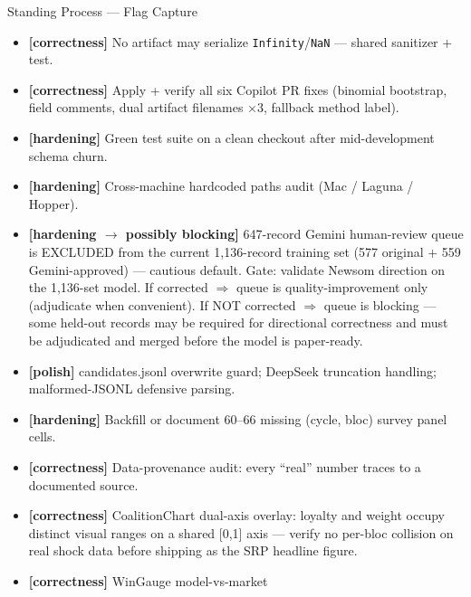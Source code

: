 \documentclass[11pt]{article}
\begin{document}
\begin{taskbox}{Standing Process --- Flag Capture}
{\begin{itemize}[leftmargin=1.6em, itemsep=1pt]
      Production covariance is the identity/diagonal fallback, NOT
      Ledoit-Wolf. Confirmed live: win-prob CI [0.653, 0.668] is MC
      sampling error around diagonal cov. OK for MVP; blocks paper-grade
      results. Fix: load real panel data so
      \texttt{run\_ilr\_montecarlo} uses the 20-cycle Ledoit-Wolf
      $\Sigma_\Delta$ rather than the near-zero fallback.
    \item[$\square$] \textbf{[correctness]} No artifact may serialize
      \texttt{Infinity}/\texttt{NaN} --- shared sanitizer + test.
    \item[$\square$] \textbf{[correctness]} Apply + verify all six Copilot
      PR fixes (binomial bootstrap, field comments, dual artifact
      filenames $\times$3, fallback method label).
    \item[$\square$] \textbf{[hardening]} Green test suite on a clean
      checkout after mid-development schema churn.
    \item[$\square$] \textbf{[hardening]} Cross-machine hardcoded paths
      audit (Mac / Laguna / Hopper).
    \item[$\square$] \textbf{[hardening $\to$ possibly blocking]} 647-record
      Gemini human-review queue is EXCLUDED from the current 1,136-record
      training set (577 original + 559 Gemini-approved) --- cautious
      default. Gate: validate Newsom direction on the 1,136-set model.
      If corrected $\Rightarrow$ queue is quality-improvement only
      (adjudicate when convenient). If NOT corrected $\Rightarrow$ queue
      is blocking --- some held-out records may be required for
      directional correctness and must be adjudicated and merged before
      the model is paper-ready.
    \item[$\square$] \textbf{[polish]} candidates.jsonl overwrite guard;
      DeepSeek truncation handling; malformed-JSONL defensive parsing.
    \item[$\square$] \textbf{[hardening]} Backfill or document 60--66
      missing (cycle, bloc) survey panel cells.
    \item[$\square$] \textbf{[correctness]} Data-provenance audit: every
      ``real'' number traces to a documented source.
    \item[$\square$] \textbf{[correctness]} CoalitionChart dual-axis
      overlay: loyalty and weight occupy distinct visual ranges on a shared
      [0,1] axis --- verify no per-bloc collision on real shock data before
      shipping as the SRP headline figure.
    \item[$\square$] \textbf{[correctness]} WinGauge model-vs-market

\end{itemize}}
\end{taskbox}
\end{document}
